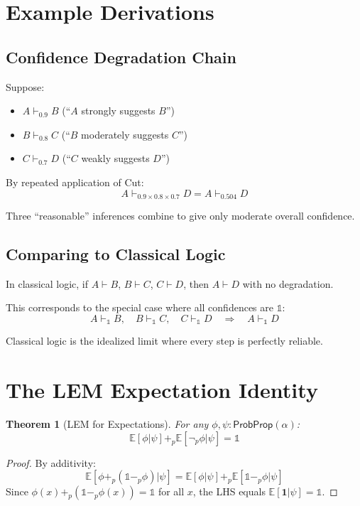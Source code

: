\documentclass[11pt,a4paper]{article}
\newtheorem{theorem}{Theorem}[section]
\newcommand{\ProbProp}{\mathsf{ProbProp}}
\newcommand{\E}{\mathbb{E}}
\newcommand{\pnot}{\neg_p}
\newcommand{\pone}{\mathbb{1}}
\newcommand{\padd}{+_p}
\newcommand{\psub}{-_p}
\newcommand{\entails}[1]{\vdash_{#1}}
\begin{document}
\section{Example Derivations}

\subsection{Confidence Degradation Chain}

Suppose:
\begin{itemize}
    \item $A \entails{0.9} B$ (``$A$ strongly suggests $B$'')
    \item $B \entails{0.8} C$ (``$B$ moderately suggests $C$'')
    \item $C \entails{0.7} D$ (``$C$ weakly suggests $D$'')
\end{itemize}

By repeated application of Cut:
\[
A \entails{0.9 \times 0.8 \times 0.7} D = A \entails{0.504} D
\]

Three ``reasonable'' inferences combine to give only moderate overall confidence.

\subsection{Comparing to Classical Logic}

In classical logic, if $A \vdash B$, $B \vdash C$, $C \vdash D$, then $A \vdash D$ with no degradation.

This corresponds to the special case where all confidences are $\pone$:
\[
A \entails{\pone} B, \quad B \entails{\pone} C, \quad C \entails{\pone} D \quad \Rightarrow \quad A \entails{\pone} D
\]

Classical logic is the idealized limit where every step is perfectly reliable.

\section{The LEM Expectation Identity}

\begin{theorem}[LEM for Expectations]
For any $\phi, \psi : \ProbProp(\alpha)$:
\[
\E[\phi|\psi] \padd \E[\pnot\phi|\psi] = \pone
\]
\end{theorem}

\begin{proof}
By additivity:
\[
\E[\phi \padd (\pone \psub \phi)|\psi] = \E[\phi|\psi] \padd \E[\pone \psub \phi|\psi]
\]
Since $\phi(x) \padd (\pone \psub \phi(x)) = \pone$ for all $x$, the LHS equals $\E[\mathbf{1}|\psi] = \pone$.
\end{proof}
\end{document}
